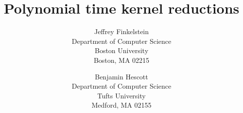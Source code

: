 

\newcommand{\plain}[1]{\text{ #1 }} %
\newcommand{\sigmastar}{\{0, 1\}^{*}} %
\newcommand{\kj}{\overset{ker}{\oplus}} %
\newcommand{\nkr}{\nleq^{P}_{ker}} %
\newcommand{\kr}{\leq^{P}_{ker}} %
\newcommand{\pot}{\leq^{P}_{pot}} %
\newcommand{\npot}{\nleq^{P}_{pot}} %
\newcommand{\krnt}{\leq_{ker}} %
\newcommand{\nkrnt}{\nleq_{ker}} %
\newcommand{\kri}{\leq^{P}_{ker,1\text{--}1}} %
\newcommand{\mor}{\leq^{P}_{m}} %
\newcommand{\mornt}{\leq_m}
\newcommand{\moe}{\equiv^{P}_{m}} %
\newcommand{\lb}{\left\{} %
\newcommand{\rb}{\right\}} %
\newcommand{\st}{\,\middle|\,} %
\newcommand{\symdiff}{\bigtriangleup} %
\newcommand{\defn}[1]{\emph{#1}} %
\newcommand{\pair}[2]{\left\langle#1,#2\right\rangle} %
\newcommand{\triple}[3]{\left\langle#1,#2,#3\right\rangle} %


\title{Polynomial time kernel reductions}%
\author{
  Jeffrey Finkelstein \\
  Department of Computer Science \\
Boston University \\
Boston, MA 02215 %
\and
Benjamin Hescott \\
Department of Computer Science \\
Tufts University \\
Medford, MA 02155 %
}

